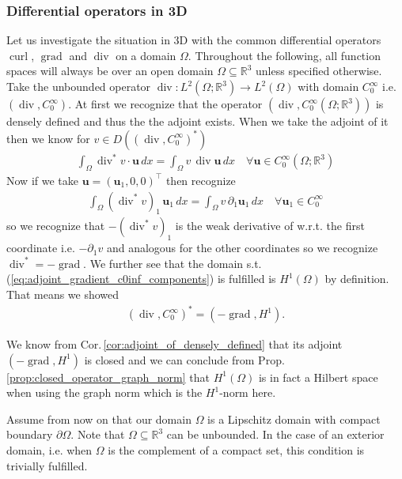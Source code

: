 \documentclass[12pt,a4paper]{article}
\numberwithin{equation}{subsection}
\numberwithin{lemma}{subsection}
\theoremstyle{definition}
\DeclareMathOperator{\curl}{curl}
\DeclareMathOperator{\diver}{div}
\DeclareMathOperator{\grad}{grad}
\newcommand{\real}{\mathbb{R}}
\begin{document}
\subsubsection{Differential operators in 3D}

Let us investigate the situation in 3D with the common differential 
operators $\curl$, $\grad$ and $\diver$ on a domain $\Omega$. Throughout the 
following, all function spaces will always be over an open domain 
$\Omega \subseteq \real^3$ unless specified otherwise.
Take the unbounded operator 
$\diver: L^2(\Omega;\real^3) \rightarrow L^2(\Omega)$ with domain 
$C_0^\infty$ i.e. $(\diver, C_0^\infty)$. At first we recognize that 
the operator $(\diver, C_0^\infty(\Omega;\real^3))$ is densely defined and thus the the adjoint exists.
When we take the adjoint of it then we know for $v \in 
D((\diver, C_0^\infty)^*)$
\begin{align*}
    \int_\Omega \diver ^* v \cdot \mathbf{u} \, dx
    = \int_\Omega v \, \diver \mathbf{u} \, dx \quad \forall 
    \mathbf{u} \in C_0^\infty(\Omega;\real^3)
\end{align*}
Now if we take $\mathbf{u} = (\mathbf{u}_1,0,0)^\top$ then recognize 
\begin{align}
    \int_\Omega (\diver ^* v)_1 \, \mathbf{u}_1 \, dx
    = \int_\Omega v \, \partial_1 \mathbf{u}_1 \, dx \quad 
        \forall \mathbf{u}_1 \in C_0^\infty \label{eq:adjoint_gradient_c0inf_components}
\end{align}
so we recognize that $-(\diver ^* v)_1$ is the weak derivative of w.r.t. the 
first coordinate i.e. $-\partial_1 v$ and analogous for the other coordinates 
so we recognize $\diver^* = -\grad$. We further see that the
domain s.t. (\ref{eq:adjoint_gradient_c0inf_components}) is fulfilled is $H^1(\Omega)$ 
by definition. That means we showed 
\begin{align}
    (\diver, C_0^\infty)^* = (-\grad, H^1). \label{eq:adjoint_gradient_c0inf} 
\end{align}

We know from Cor.\,\ref{cor:adjoint_of_densely_defined} 
that its adjoint $(-\grad, H^1)$ is closed and 
we can conclude from Prop.\,\ref{prop:closed_operator_graph_norm} 
that $H^1(\Omega)$ is in fact a Hilbert space 
when using the graph norm which is the $H^1$-norm here.

Assume from now on that our domain $\Omega$ is a Lipschitz domain 
with compact boundary $\partial \Omega$. Note that $\Omega \subseteq \real^3$ 
can be unbounded. In the case of an exterior domain, i.e. when $\Omega$ is 
the complement of a compact set, this condition is trivially fulfilled.
\end{document}
